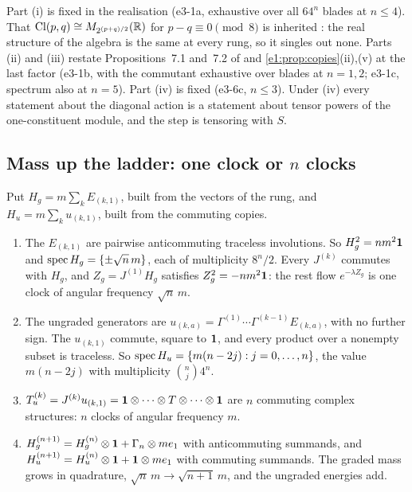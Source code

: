 Part (i) is fixed in the realisation (e3-1a, exhaustive over all $64^n$ blades at $n\le4$). That $\mathrm{Cl}(p,q)\cong M_{2^{(p+q)/2}}(\mathbb{R})$ for $p-q\equiv0\pmod8$
is inherited \cite{LawsonMichelsohn89}: the real structure of the algebra is the same at every rung, so it singles out none. Parts (ii) and
(iii) restate Propositions~7.1 and~7.2 of \cite{RE} and \cref{e1:prop:copies}(ii),(v) at the last factor (e3-1b, with the commutant
exhaustive over blades at $n=1,2$; e3-1c, spectrum also at $n=5$). Part (iv) is fixed (e3-6c, $n\le3$). Under (iv) every statement about the
diagonal action is a statement about tensor powers of the one-constituent module, and the step is tensoring with $S$.

\subsection{Mass up the ladder: one clock or \texorpdfstring{$n$}{n} clocks}
\label{e3:sec:mass}

Put $H_g=m\sum_kE_{(k,1)}$, built from the vectors of the rung, and $H_u=m\sum_ku_{(k,1)}$, built from the commuting copies.

\begin{proposition}
\label{e3:prop:mass}
\begin{enumerate}[label=(\roman*),leftmargin=2.2em]
\item The $E_{(k,1)}$ are pairwise anticommuting traceless involutions. So $H_g^2=nm^2\mathbf 1$ and $\operatorname{spec} H_g=\{\pm\sqrt n\,m\}$, each of multiplicity
$8^n/2$. Every $J^{(k)}$ commutes with $H_g$, and $Z_g=J^{(1)}H_g$ satisfies $Z_g^2=-nm^2\mathbf 1$: the rest flow $e^{-\lambda Z_g}$ is one clock of
angular frequency $\sqrt n\,m$.
\item The ungraded generators are $u_{(k,a)}=\Gamma^{(1)}\cdots\Gamma^{(k-1)}E_{(k,a)}$, with no further sign. The $u_{(k,1)}$ commute, square to $\mathbf 1$, and
every product over a nonempty subset is traceless. So $\operatorname{spec} H_u=\{m(n-2j):j=0,\dots,n\}$, the value $m(n-2j)$ with multiplicity $\binom nj4^n$.
\item $T^{(k)}_u=J^{(k)}u_{(k,1)}=\mathbf 1\otimes\cdots\otimes T\otimes\cdots\otimes\mathbf 1$ are $n$ commuting complex structures: $n$ clocks of angular frequency $m$.
\item $H_g^{(n+1)}=H_g^{(n)}\otimes\mathbf 1+\Gamma_n\otimes me_1$ with anticommuting summands, and $H_u^{(n+1)}=H_u^{(n)}\otimes\mathbf 1+\mathbf 1\otimes me_1$ with commuting
summands. The graded mass grows in quadrature, $\sqrt n\,m\to\sqrt{n+1}\,m$, and the ungraded energies add.
\end{enumerate}
\end{proposition}


